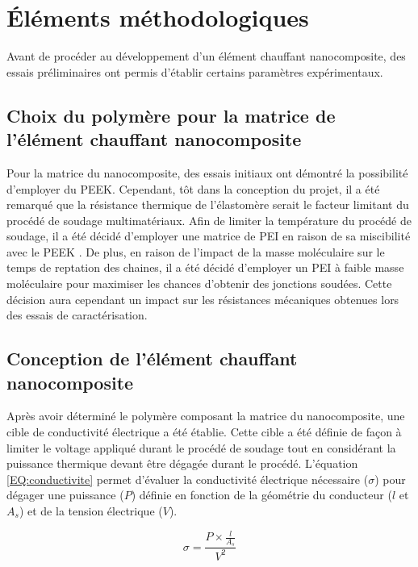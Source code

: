 \section{Éléments méthodologiques}

Avant de procéder au développement d'un élément chauffant nanocomposite, des essais préliminaires ont permis d'établir certains paramètres expérimentaux. 

\subsection{Choix du polymère pour la matrice de l'élément chauffant nanocomposite}

Pour la matrice du nanocomposite, des essais initiaux ont démontré la possibilité d'employer du PEEK. 
Cependant, tôt dans la conception du projet, il a été remarqué que la résistance thermique de l'élastomère serait le facteur limitant du procédé de soudage multimatériaux. 
Afin de limiter la température du procédé de soudage, il a été décidé d'employer une matrice de PEI en raison de sa miscibilité avec le PEEK \cite{Torre1992,Crevecoeur1991}. 
De plus, en raison de l'impact de la masse moléculaire sur le temps de reptation des chaines, il a été décidé d'employer un PEI à faible masse moléculaire pour maximiser les chances d'obtenir des jonctions soudées. 
Cette décision aura cependant un impact sur les résistances mécaniques obtenues lors des essais de caractérisation. 

\subsection{Conception de l'élément chauffant nanocomposite}

Après avoir déterminé le polymère composant la matrice du nanocomposite, une cible de conductivité électrique a été établie. 
Cette cible a été définie de façon à limiter le voltage appliqué durant le procédé de soudage tout en considérant la puissance thermique devant être dégagée durant le procédé. 
L'équation \ref{EQ:conductivite} permet d'évaluer la conductivité électrique nécessaire ($\sigma$) pour dégager une puissance ($P$) définie en fonction de la géométrie du conducteur ($l$ et $A_s$) et de la tension électrique ($V$). 

\begin{equation}
\label{EQ:conductivite}
\sigma = \frac{P \times \frac{l}{A_s}}{V^2}
\end{equation} 


